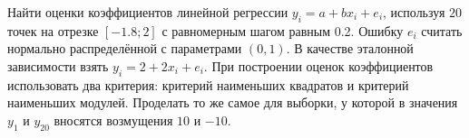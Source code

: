 Найти оценки коэффициентов линейной регрессии $y_{i} = a + bx_{i} + e_{i}$, используя $20$ точек на отрезке $[-1.8; 2]$ с равномерным шагом равным 0.2.
Ошибку $e_{i}$ считать нормально распределённой с параметрами $(0, 1)$.
В качестве эталонной зависимости взять $y_{i} = 2 + 2x_{i} + e_{i}$.
При построении оценок коэффициентов использовать два критерия: критерий наименьших квадратов и критерий наименьших модулей.
Проделать то же самое для выборки, у которой в значения $y_{1}$ и $y_{20}$ вносятся возмущения $10$ и $-10$.
